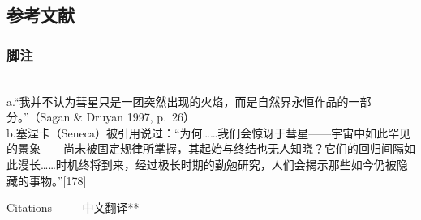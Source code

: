 \subsection{参考文献}
\subsubsection{脚注}\\
a.“我并不认为彗星只是一团突然出现的火焰，而是自然界永恒作品的一部分。”（Sagan \& Druyan 1997, p.~26）\\
b.塞涅卡（Seneca）被引用说过：“为何……我们会惊讶于彗星——宇宙中如此罕见的景象——尚未被固定规律所掌握，其起始与终结也无人知晓？它们的回归间隔如此漫长……时机终将到来，经过极长时期的勤勉研究，人们会揭示那些如今仍被隐藏的事物。”[178]

Citations —— 中文翻译**

